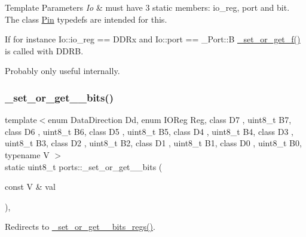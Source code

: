 \begin{DoxyTemplParams}{Template Parameters}
{\em Io} & must have 3 static members\+: {\ttfamily io\+\_\+reg}, {\ttfamily port} and {\ttfamily bit}. The class \hyperlink{structports_1_1Pin}{Pin} {\ttfamily typedef}s are intended for this.\\
\hline
\end{DoxyTemplParams}
If for instance Io\+::io\+\_\+reg == D\+D\+Rx and Io\+::port == \+\_\+\+Port\+::B \hyperlink{namespaceports_a75686ee2e9a291c0095dec6d73e4af8d}{\+\_\+set\+\_\+or\+\_\+get\+\_\+f()} is called with {\ttfamily D\+D\+RB}.

Probably only useful internally. \hypertarget{namespaceports_a9cb9b3646fb9795dfbe079336dfc6fbb}{}\label{namespaceports_a9cb9b3646fb9795dfbe079336dfc6fbb} 
\subsubsection{\texorpdfstring{\+\_\+set\+\_\+or\+\_\+get\+\_\+\_\+bits()}{\_set\_or\_get\_8\_bits()}}
{\footnotesize\ttfamily template$<$enum Data\+Direction Dd, enum I\+O\+Reg Reg, class D7 , uint8\+\_\+t B7, class D6 , uint8\+\_\+t B6, class D5 , uint8\+\_\+t B5, class D4 , uint8\+\_\+t B4, class D3 , uint8\+\_\+t B3, class D2 , uint8\+\_\+t B2, class D1 , uint8\+\_\+t B1, class D0 , uint8\+\_\+t B0, typename V $>$ \\
static uint8\+\_\+t ports\+::\+\_\+set\+\_\+or\+\_\+get\+\_\+\_\+bits (\begin{DoxyParamCaption}\item[{const V \&}]{val }\end{DoxyParamCaption})\hspace{0.3cm}{\ttfamily [inline]}, {\ttfamily [static]}}



Redirects to \hyperlink{namespaceports_a541ed8a2807f6d65c80cdf90cd7106eb}{\+\_\+set\+\_\+or\+\_\+get\+\_\+\_\+bits\+\_\+regs()}. 


